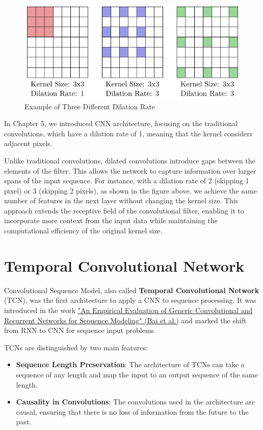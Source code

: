 \begin{figure}[!htbp]
    \centering
    \includegraphics[width=0.85\linewidth]{tikz/chapter8 - Dilation.pdf}
    \caption{Example of Three Different Dilation Rate}
\end{figure}

In Chapter 5, we introduced CNN architecture, focusing on the traditional convolutions, which have a dilation rate of 1, meaning that the kernel considers adjacent pixels. 

Unlike traditional convolutions, dilated convolutions introduce gaps between the elements of the filter. This allows the network to capture information over larger spans of the input sequence. For instance, with a dilation rate of 2 (skipping 1 pixel) or 3 (skipping 2 pixels), as shown in the figure above, we achieve the same number of features in the next layer without changing the kernel size. This approach extends the receptive field of the convolutional filter, enabling it to incorporate more context from the input data while maintaining the computational efficiency of the original kernel size.


\section{Temporal Convolutional Network}

Convolutional Sequence Model, also called \textbf{Temporal Convolutional Network} (TCN), was the first architecture to apply a CNN to sequence processing. It was introduced in the work \href{https://arxiv.org/pdf/1803.01271}{"An Empirical Evaluation of Generic Convolutional and Recurrent Networks for Sequence Modeling" (Bai et al.)} and marked the shift from RNN to CNN for sequence input problems.

TCNs are distinguished by two main features:
\begin{itemize}
    \item \textbf{Sequence Length Preservation}: The architecture of TCNs can take a sequence of any length and map the input to an output sequence of the same length.
    \item \textbf{Causality in Convolutions}: The convolutions used in the architecture are causal, ensuring that there is no loss of information from the future to the past.
\end{itemize}

